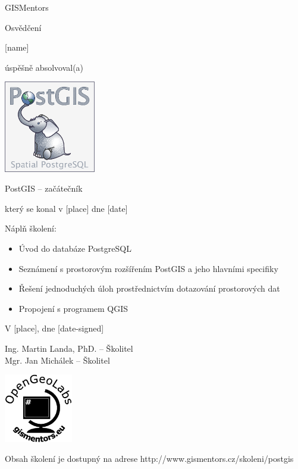 \documentclass[12pt, a4paper]{letter}
\begin{document}
\pagestyle{empty}
\begin{center}

{\Large GISMentors}

{\Huge Osvědčení}

{\Large [name]}

úspěšně absolvoval(a)

\includegraphics[width=0.30\textwidth]{../images/postgis.png}

{\Large PostGIS -- začátečník}

který se konal v [place] dne [date]
\end{center}

Náplň školení:

\begin{itemize}
    \item Úvod do databáze PostgreSQL
    \item Seznámení s prostorovým rozšířením PostGIS a jeho hlavními specifiky
    \item Řešení jednoduchých úloh prostřednictvím dotazování prostorových dat
    \item Propojení s programem QGIS
\end{itemize}

\vfill
\parbox{7cm}{

    V [place], dne [date-signed]\\

\vfill

    Ing. Martin Landa, PhD. -- Školitel\\

\vfill
    Mgr. Jan Michálek -- Školitel
}
\hfill
\parbox{3cm}{
    \includegraphics[width=3cm]{../images/placka.eps}
}

\vfill

\begin{center}
{\footnotesize Obsah školení je dostupný na adrese
http://www.gismentors.cz/skoleni/postgis}
\end{center}
\end{document}
